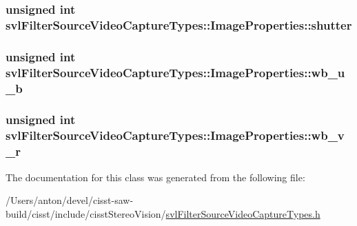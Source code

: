 \subsubsection[{shutter}]{\setlength{\rightskip}{0pt plus 5cm}unsigned int svl\+Filter\+Source\+Video\+Capture\+Types\+::\+Image\+Properties\+::shutter}\label{classsvl_filter_source_video_capture_types_1_1_image_properties_a86e0a67ff502430038dd3263322a19ad}
\hypertarget{classsvl_filter_source_video_capture_types_1_1_image_properties_a3f11dd2be120711075498c0711d77251}{}
\subsubsection[{wb\+\_\+u\+\_\+b}]{\setlength{\rightskip}{0pt plus 5cm}unsigned int svl\+Filter\+Source\+Video\+Capture\+Types\+::\+Image\+Properties\+::wb\+\_\+u\+\_\+b}\label{classsvl_filter_source_video_capture_types_1_1_image_properties_a3f11dd2be120711075498c0711d77251}
\hypertarget{classsvl_filter_source_video_capture_types_1_1_image_properties_a45583b41d5248ffc131b3982e14bab34}{}
\subsubsection[{wb\+\_\+v\+\_\+r}]{\setlength{\rightskip}{0pt plus 5cm}unsigned int svl\+Filter\+Source\+Video\+Capture\+Types\+::\+Image\+Properties\+::wb\+\_\+v\+\_\+r}\label{classsvl_filter_source_video_capture_types_1_1_image_properties_a45583b41d5248ffc131b3982e14bab34}


The documentation for this class was generated from the following file\+:\begin{DoxyCompactItemize}
\item 
/\+Users/anton/devel/cisst-\/saw-\/build/cisst/include/cisst\+Stereo\+Vision/\hyperlink{svl_filter_source_video_capture_types_8h}{svl\+Filter\+Source\+Video\+Capture\+Types.\+h}\end{DoxyCompactItemize}
